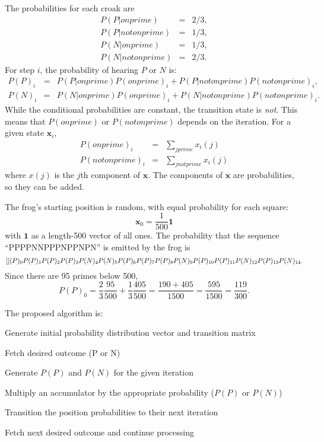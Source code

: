 \documentclass{article}
\begin{document}
The probabilities for each croak are
\begin{eqnarray}
	P(P | on prime) & = & 2/3, \\
	P(P | not on prime) & = & 1/3, \\
	P(N | on prime) & = & 1/3, \\
	P(N | not on prime) & = & 2/3.
\end{eqnarray}
For step $i$, the probability of hearing $P$ or $N$ is:
\begin{eqnarray}
	P(P)_i & = & P(P | on prime)P(on prime)_i + P(P | not on prime)P(not on prime)_i, \\
	P(N)_i & = & P(N | on prime)P(on prime)_i + P(N | not on prime)P(not on prime)_i.
\end{eqnarray}
While the conditional probabilities are constant, the transition state is \emph{not}.  This means that $P(on prime)$ or $P(not on prime)$ depends on the iteration.  For a given state $\mathbf{x}_i$,
\begin{eqnarray}
	P(on prime)_i & = & \sum_{j prime} x_i(j) \\
	P(not on prime)_i & = & \sum_{j not prime} x_i(j)
\end{eqnarray}
where $x(j)$ is the $j$th component of $\mathbf{x}$.  The components of $\mathbf{x}$ are probabilities, so they can be added.

The frog's starting position is random, with equal probability for each square:
\begin{equation}
	\mathbf{x}_0 = \frac{1}{500} \mathbf{1}
\end{equation}
with $\mathbf{1}$ as a length-500 vector of all ones.  The probability that the sequence ``PPPPNNPPPNPPNPN'' is emitted by the frog is
\begin{equation}
	\nonumber
\pageref{}(P)_0 P(P)_1 P(P)_2 P(P)_3 P(N)_4 P(N)_5 P(P)_6 P(P)_7 P(P)_8 P(N)_9 P(P)_{10} P(P)_{11} P(N)_{12} P(P)_{13} P(N)_{14}.
\end{equation}
Since there are 95 primes below 500,
\begin{equation}
	P(P)_0 = \frac{2}{3}\frac{95}{500} + \frac{1}{3}\frac{405}{500} = \frac{190 + 405}{1500} = \frac{595}{1500} = \frac{119}{300}.
\end{equation}

The proposed algorithm is:
\begin{enumerate*}
	\item Generate initial probability distribution vector and transition matrix
	\item Fetch desired outcome (P or N)
	\item Generate $P(P)$ and $P(N)$ for the given iteration
	\item Multiply an accumulator by the appropriate probability ($P(P)$ or $P(N)$)
	\item Transition the position probabilities to their next iteration
	\item Fetch next desired outcome and continue processing
\end{enumerate*}
\end{document}
